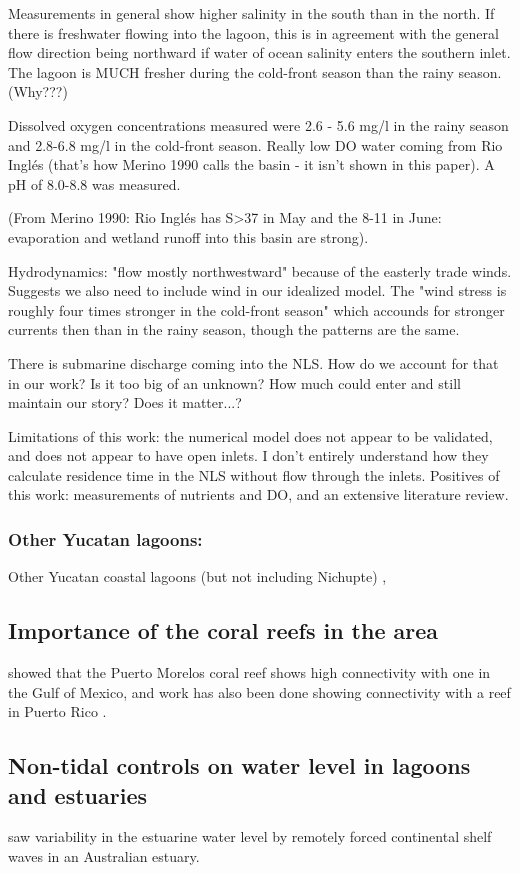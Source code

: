 \documentclass[11pt]{article}
\begin{document}
Measurements in general show higher salinity in the south than in the north. If there is freshwater flowing into the lagoon, this is in agreement with the general flow direction being northward if water of ocean salinity enters the southern inlet. The lagoon is MUCH fresher during the cold-front season than the rainy season. (Why???) 

Dissolved oxygen concentrations measured were 2.6 - 5.6 mg/l in the rainy season and 2.8-6.8 mg/l in the cold-front season. Really low DO water coming from Rio Inglés (that's how Merino 1990 calls the basin - it isn't shown in this paper). A pH of 8.0-8.8 was measured. 

(From Merino 1990: Rio Inglés has S>37 in May and the 8-11 in June: evaporation and wetland runoff into this basin are strong).

Hydrodynamics: "flow mostly northwestward" because of the easterly trade winds. Suggests we also need to include wind in our idealized model. The "wind stress is roughly four times stronger in the cold-front season" which accounds for stronger currents then than in the rainy season, though the patterns are the same.

There is submarine discharge coming into the NLS. How do we account for that in our work? Is it too big of an unknown? How much could enter and still maintain our story? Does it matter...?

Limitations of this work: the numerical model does not appear to be validated, and does not appear to have open inlets. I don't entirely understand how they calculate residence time in the NLS without flow through the inlets. Positives of this work: measurements of nutrients and DO, and an extensive literature review.  

\subsubsection*{Other Yucatan lagoons:}
Other Yucatan coastal lagoons (but not including Nichupte) \citep{herrerasilveria98}, 


\subsection*{Importance of the coral reefs in the area}

\citet{villegassanchez14} showed that the Puerto Morelos coral reef shows high connectivity with one in the Gulf of Mexico, and work has also been done showing connectivity with a reef in Puerto Rico \citep{labastidaestrada14}.

\subsection*{Non-tidal controls on water level in lagoons and estuaries}

\citet{ocallaghan07} saw variability in the estuarine water level by remotely forced continental shelf waves in an Australian estuary.


{}

\end{document}
